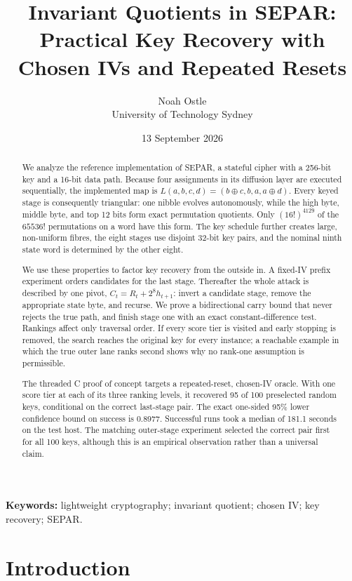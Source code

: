 \documentclass[10pt]{article}
\title{Invariant Quotients in SEPAR: Practical Key Recovery with Chosen IVs and Repeated Resets}
\author{Noah Ostle\\University of Technology Sydney}
\date{13 September 2026}
\theoremstyle{plain}
\theoremstyle{definition}
\theoremstyle{remark}
\newcommand{\xor}{\mathbin{\oplus}}
\begin{document}
\maketitle

\begin{abstract}
We analyze the reference implementation of SEPAR, a stateful cipher with a
256-bit key and a 16-bit data path.  Because four assignments in its diffusion
layer are executed sequentially, the implemented map is
\(L(a,b,c,d)=(b\xor c,b,a,a\xor d)\).  Every keyed stage is consequently
triangular: one nibble evolves autonomously, while the high byte, middle byte,
and top 12 bits form exact permutation quotients.  Only
\((16!)^{4129}\) of the \(65536!\) permutations on a word have this form.
The key schedule further creates large, non-uniform fibres, the eight stages
use disjoint 32-bit key pairs, and the nominal ninth state word is determined
by the other eight.

We use these properties to factor key recovery from the outside in.  A
fixed-IV prefix experiment orders candidates for the last stage.  Thereafter
the whole attack is described by one pivot,
\(C_t=R_t+2^8h_{t+1}\): invert a candidate stage, remove the appropriate state
byte, and recurse.  We prove a bidirectional carry bound that never rejects
the true path, and finish stage one with an exact constant-difference test.
Rankings affect only traversal order.  If every score tier is visited and
early stopping is removed, the search reaches the original key for every
instance; a reachable example in which the true outer lane ranks second shows
why no rank-one assumption is permissible.

The threaded C proof of concept targets a repeated-reset, chosen-IV oracle.
With one score tier at each of its three ranking levels, it recovered 95 of
100 preselected random keys, conditional on the correct last-stage pair.  The
exact one-sided 95\% lower confidence bound on success is 0.8977.  Successful
runs took a median of 181.1 seconds on the test host.  The matching outer-stage
experiment selected the correct pair first for all 100 keys, although this is
an empirical observation rather than a universal claim.
\end{abstract}

\noindent\textbf{Keywords:} lightweight cryptography; invariant quotient;
chosen IV; key recovery; SEPAR.

\section{Introduction}
\end{document}
